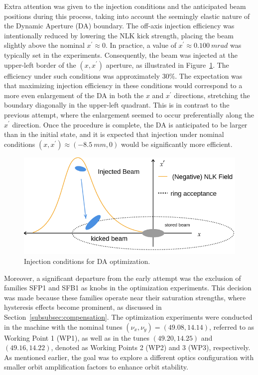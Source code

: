 Extra attention was given to the injection conditions and the anticipated beam positions during this process, taking into account the seemingly elastic nature of the Dynamic Aperture (DA) boundary. The off-axis injection efficiency was intentionally reduced by lowering the NLK kick strength, placing the beam slightly above the nominal $x^\prime\approx 0$. In practice, a value of $x^\prime\approx 0.100~\unit{mrad}$ was typically set in the experiments. Consequently, the beam was injected at the upper-left border of the $(x,x^\prime)$ aperture, as illustrated in Figure~\ref{fig:inj_cond}. The efficiency under such conditions was approximately $30\%$. The expectation was that maximizing injection efficiency in these conditions would correspond to a more even enlargement of the DA in both the $x$ and $x^{\prime}$ directions, stretching the boundary diagonally in the upper-left quadrant. This is in contrast to the previous attempt, where the enlargement seemed to occur preferentially along the $x^\prime$ direction. Once the procedure is complete, the DA is anticipated to be larger than in the initial state, and it is expected that injection under nominal conditions $(x, x^\prime)\approx(-8.5~\unit{mm}, 0)$ would be significantly more efficient.
\begin{figure}[b]
    \centering
    \includegraphics[width=0.7\columnwidth]{Images/inj_cond.png}
    \caption[Injection conditions for DA optimization.]{Injection conditions for DA optimization.}
    \label{fig:inj_cond}
\end{figure}

Moreover, a significant departure from the early attempt was the exclusion of families SFP1 and SFB1 as knobs in the optimization experiments. This decision was made because these families operate near their saturation strengths, where hysteresis effects become prominent, as discussed in Section~\ref{subsubsec:compensation}. The optimization experiments were conducted in the machine with the nominal tunes $(\nu_x,\nu_y)=(49.08, 14.14)$, referred to as Working Point 1 (WP1), as well as in the tunes $(49.20, 14.25)$ and $(49.16, 14.22)$, denoted as Working Points 2 (WP2) and 3 (WP3), respectively. As mentioned earlier, the goal was to explore a different optics configuration with smaller orbit amplification factors to enhance orbit stability.
